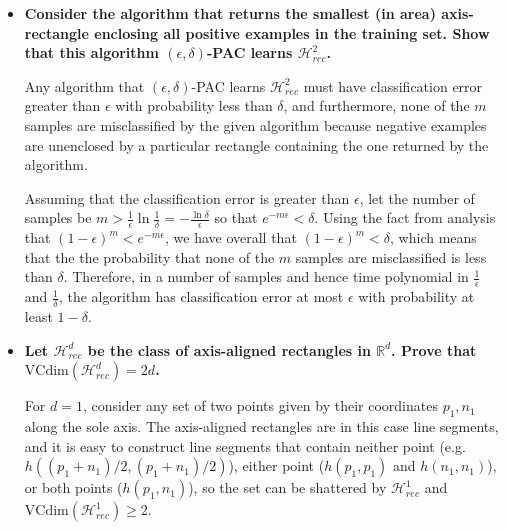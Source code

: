 \documentclass[a4paper,12pt]{article}
\theoremstyle{remark}
\begin{document}
    \begin{itemize}
        \item
            \boldmath\textbf{Consider the algorithm that returns the smallest (in area) axis-rectangle enclosing all positive examples in the training set. Show that this algorithm $(\epsilon, \delta)$-PAC learns $\mathcal{H}_{rec}^2$.
            }\unboldmath \par
            Any algorithm that $(\epsilon, \delta)$-PAC learns $\mathcal{H}_{rec}^2$ must have classification error greater than $\epsilon$ with probability less than $\delta$, and furthermore, none of the $m$ samples are misclassified by the given algorithm because negative examples are unenclosed by a particular rectangle containing the one returned by the algorithm. \par
            Assuming that the classification error is greater than $\epsilon$, let the number of samples be $m > \frac{1}{\epsilon} \ln\frac{1}{\delta} = -\frac{\ln\delta}{\epsilon}$ so that $e^{-m\epsilon} < \delta$. Using the fact from analysis that $(1 - \epsilon)^m < e^{-m\epsilon}$, we have overall that $(1 - \epsilon)^m < \delta$, which means that the the probability that none of the $m$ samples are misclassified is less than $\delta$. Therefore, in a number of samples and hence time polynomial in $\frac{1}{\epsilon}$ and $\frac{1}{\delta}$, the algorithm has classification error at most $\epsilon$ with probability at least $1 - \delta$.
        \item
            \boldmath\textbf{Let $\mathcal{H}_{rec}^d$ be the class of axis-aligned rectangles in $\mathbb{R}^d$. Prove that $\mathrm{VCdim}(\mathcal{H}_{rec}^d) = 2d$.
            }\unboldmath \par
            For $d = 1$, consider any set of two points given by their coordinates $p_1, n_1$ along the sole axis. The axis-aligned rectangles are in this case line segments, and it is easy to construct line segments that contain neither point (e.g. $h((p_1 + n_1)/2, (p_1 + n_1)/2)$), either point ($h(p_1, p_1)$ and $h(n_1, n_1)$), or both points ($h(p_1, n_1)$), so the set can be shattered by $\mathcal{H}_{rec}^1$ and $\mathrm{VCdim}(\mathcal{H}_{rec}^1) \geq 2$. \par

\end{itemize}
\end{document}
